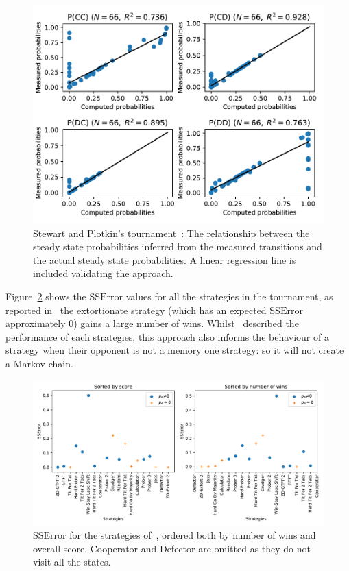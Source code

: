 \documentclass[a4paper]{article}
\begin{document}
\begin{figure}[!htbp]
    \centering
    \includegraphics[width=.8\textwidth]{./assets/img/computed_probabilities_vs_theoretic_probabilities_in_stewart_plotkin/main.pdf}
    \caption{Stewart and Plotkin's tournament~\cite{Stewart2012}: The
        relationship between the steady state probabilities inferred from the
        measured transitions and the actual steady state probabilities. A linear
        regression line is included validating the approach.}
    \label{fig:computed_probabilities_vs_theoretic_probabilities_in_stewart_plotkin}
\end{figure}

Figure~\ref{fig:SSError_overall_in_stewart_plotkin} shows the \(\text{SSError}\)
values for all the strategies in the tournament, as reported
in~\cite{Stewart2012} the extortionate strategy (which has an expected
\(\text{SSError}\) approximately 0) gains a large number of wins.
Whilst~\cite{Stewart2012} described the performance of each strategies, this
approach also informs the behaviour of a strategy when their opponent is not a
memory one strategy: so it will not create a Markov chain.

\begin{figure}[!htbp]
    \centering
    \includegraphics[width=.8\textwidth]{./assets/img/SSError_overall_in_stewart_plotkin/main.pdf}
    \caption{\(\text{SSError}\) for the strategies of~\cite{Stewart2012}, ordered both by
    number of wins and overall score. Cooperator and Defector are omitted as
    they do not visit all the states.}
    \label{fig:SSError_overall_in_stewart_plotkin}
\end{figure}
\end{document}
